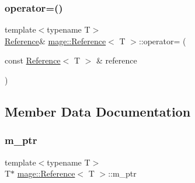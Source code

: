 \hypertarget{classmage_1_1_reference_a0e0fadab4a752fb78124380feeafb2a2}{}\label{classmage_1_1_reference_a0e0fadab4a752fb78124380feeafb2a2} 
\subsubsection{\texorpdfstring{operator=()}{operator=()}\hspace{0.1cm}{\footnotesize\ttfamily [2/2]}}
{\footnotesize\ttfamily template$<$typename T$>$ \\
\hyperlink{classmage_1_1_reference}{Reference}\& \hyperlink{classmage_1_1_reference}{mage\+::\+Reference}$<$ T $>$\+::operator= (\begin{DoxyParamCaption}\item[{const \hyperlink{classmage_1_1_reference}{Reference}$<$ T $>$ \&}]{reference }\end{DoxyParamCaption})}



\subsection{Member Data Documentation}
\hypertarget{classmage_1_1_reference_aa3d84127867c389254b7257cd3ed0733}{}\label{classmage_1_1_reference_aa3d84127867c389254b7257cd3ed0733} 
\subsubsection{\texorpdfstring{m\+\_\+ptr}{m\_ptr}}
{\footnotesize\ttfamily template$<$typename T$>$ \\
T$\ast$ \hyperlink{classmage_1_1_reference}{mage\+::\+Reference}$<$ T $>$\+::m\+\_\+ptr\hspace{0.3cm}{\ttfamily [private]}}

